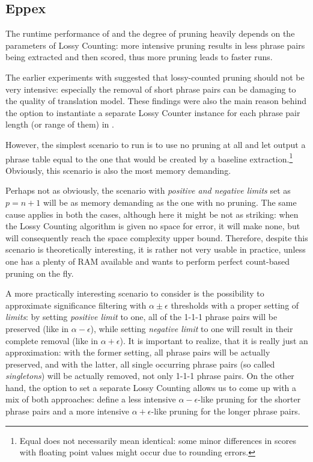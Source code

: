 \subsection{Eppex}

The runtime performance of \eppex{} and the degree of pruning heavily depends
on the parameters of Lossy Counting: more intensive pruning results in less phrase pairs
being extracted and then scored, thus more pruning leads to faster \eppex{} runs.

The earlier experiments with \eppex{} \citep{przywara:eppex} suggested that lossy-counted
pruning should not be very intensive: especially the removal of short phrase pairs can be
damaging to the quality of translation model.
These findings were also the main reason behind the option to instantiate a separate
Lossy Counter instance for each phrase pair length (or range of them) in \eppex{}.

However, the simplest scenario to run is to use no pruning at all and let \eppex{} output
a phrase table equal to the one that would be created by a baseline extraction.\footnote{Equal
does not necessarily mean identical: some minor differences in scores with floating point
values might occur due to rounding errors.}
Obviously, this scenario is also the most memory demanding.

Perhaps not as obviously, the scenario with \emph{positive and negative limits} set as
$p = n + 1$ will be as memory demanding as the one with no pruning.
The same cause applies in both the cases, although here it might be not as striking:
when the Lossy Counting algorithm is given no space for error, it will make none,
but will consequently reach the space complexity upper bound.
Therefore, despite this scenario is theoretically interesting, it is rather not very
usable in practice, unless one has a plenty of RAM available and wants to perform perfect
count-based pruning on the fly.

A more practically interesting scenario to consider is the possibility to approximate
significance filtering with $\alpha \pm \epsilon$ thresholds with a proper setting of
\emph{limits}: by setting \emph{positive limit} to one, all of the 1-1-1 phrase pairs
will be preserved (like in $\alpha - \epsilon$), while setting \emph{negative limit} to
one will result in their complete removal (like in $\alpha + \epsilon$).
It is important to realize, that it is really just an approximation:
with the former setting, all phrase pairs will be actually preserved,
and with the latter, all single occurring phrase pairs (so called \emph{singletons})
will be actually removed, not only 1-1-1 phrase pairs.
On the other hand, the option to set a separate Lossy Counting allows us to come up with
a mix of both approaches: define a less intensive $\alpha - \epsilon$-like pruning for
the shorter phrase pairs and a more intensive $\alpha + \epsilon$-like pruning for the
longer phrase pairs.

